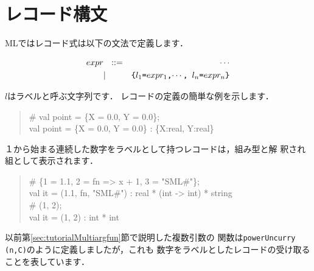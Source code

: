 \documentclass{jbook}
\newif\ifjp
\newcommand{\txt}[2]{#1}
\begin{document}
\section{\txt{レコード構文}{Record expressions}}
\label{sec:extensionRecordExpression}

\ifjp%
	MLではレコード式は以下の文法で定義します．
\begin{tt}
\begin{eqnarray*}
expr &\mbox{\ \ }::=& \cdots \\
     &|& \mbox{\tt \{$l_1$=$expr_1$,$\cdots$, $l_n$=$expr_n$\}}
\end{eqnarray*}
\end{tt}
	$l$はラベルと呼ぶ文字列です．
	レコードの定義の簡単な例を示します．
\begin{tt}
\begin{quote}
\# val point = \{X = 0.0, Y = 0.0\};\\
val point = \{X = 0.0, Y = 0.0\} : \{X:real, Y:real\}
\end{quote}
\end{tt}
	１から始まる連続した数字をラベルとして持つレコードは，組み型と解
釈され組として表示されます．
\begin{tt}
\begin{quote}
\#  \{1 = 1.1, 2 = fn => x + 1, 3 = "SML\#"\};\\
val it = (1.1, fn, "SML\#") : real * (int -> int) * string\\
\# (1, 2);\\
val it = (1, 2) : int * int
\end{quote}
\end{tt}
	以前第\ref{sec:tutorialMultiargfun}節で説明した複数引数の
関数は{\tt powerUncurry (n,C)}のように定義しましたが，これも
数字をラベルとしたレコードの受け取ることを表しています．
\end{document}
